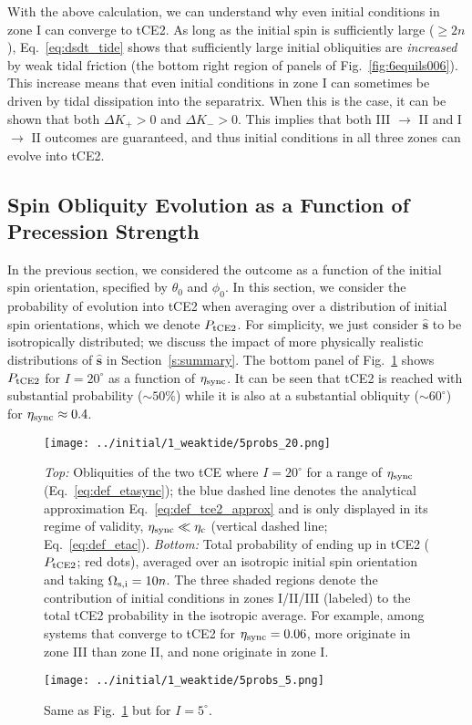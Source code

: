 \documentclass[
        fleqn,
        usenatbib,
    ]{mnras}
\newcommand*{\uv}[1]{\hat{\boldsymbol{\mathbf{#1}}}}
\begin{document}
With the above calculation, we can understand why even initial conditions in
zone I can converge to tCE2. As long as the initial spin is sufficiently large
($\geq 2n$), Eq.~\eqref{eq:dsdt_tide} shows that sufficiently large initial
obliquities are \emph{increased} by weak tidal friction (the bottom right
region of panels of Fig.~\ref{fig:6equils006}). This increase means that even
initial conditions in zone I can sometimes be driven by tidal dissipation into
the separatrix. When this is the case, it can be shown that both $\Delta K_+ >
0$ and $\Delta K_- > 0$. This implies that both III $\to$ II and I $\to$ II
outcomes are guaranteed, and thus initial conditions in all three zones can
evolve into tCE2.

\subsection{Spin Obliquity Evolution as a Function of Precession Strength
}\label{ss:tce2_etasync}

In the previous section, we considered the outcome as a function of the initial
spin orientation, specified by $\theta_0$ and $\phi_0$. In this section, we
consider the probability of evolution into tCE2 when averaging over a
distribution of initial spin orientations, which we denote $P_{\rm tCE2}$. For
simplicity, we just consider $\uv{s}$ to be isotropically distributed; we
discuss the impact of more physically realistic distributions of $\uv{s}$ in
Section~\ref{s:summary}. The bottom panel of Fig.~\ref{fig:probs20} shows
$P_{\rm tCE2}$ for $I = 20^\circ$ as a function of $\eta_{\rm sync}$. It can be
seen that tCE2 is reached with substantial probability ($\sim 50\%$) while it is
also at a substantial obliquity ($\sim 60^\circ$) for $\eta_{\rm sync} \approx
0.4$.
\begin{figure}
    \centering
    \texttt{[image: ../initial/1\_weaktide/5probs\_20.png]}
    \caption{\emph{Top:} Obliquities of the two tCE where $I = 20^\circ$ for a
    range of $\eta_{\rm sync}$ (Eq.~\ref{eq:def_etasync}); the blue dashed line
    denotes the analytical approximation Eq.~\eqref{eq:def_tce2_approx} and is
    only displayed in its regime of validity, $\eta_{\rm sync} \ll \eta_{\rm c}$
    (vertical dashed line; Eq.~\ref{eq:def_etac}). \emph{Bottom:} Total
    probability of ending up in tCE2 ($P_{\rm tCE2}$; red dots), averaged over
    an isotropic initial spin orientation and taking $\Omega_{\rm s, i} = 10n$.
    The three shaded regions denote the contribution of initial conditions in
    zones I/II/III (labeled) to the total tCE2 probability in the isotropic
    average. For example, among systems that converge to tCE2 for $\eta_{\rm
    sync} = 0.06$, more originate in zone III than zone II, and none originate
    in zone I.}\label{fig:probs20}
\end{figure}
\begin{figure}
    \centering
    \texttt{[image: ../initial/1\_weaktide/5probs\_5.png]}
    \caption{Same as Fig.~\ref{fig:probs20} but for $I =
    5^\circ$.}\label{fig:probs5}
\end{figure}
\end{document}
